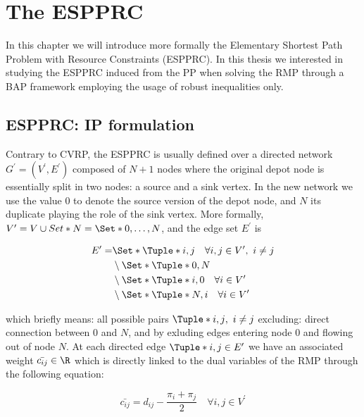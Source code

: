 \chapter{The ESPPRC}
In this chapter we will introduce more formally the Elementary Shortest Path Problem with Resource Constraints (ESPPRC).
In this thesis we interested in studying the ESPPRC induced from the PP when solving the RMP through a BAP framework employing the usage of robust inequalities only.


\section{ESPPRC: IP formulation}
Contrary to CVRP, the ESPPRC is usually defined over a directed network $G^\prime = (V^\prime, E^\prime)$ composed
of $N + 1$ nodes where the original depot node is essentially split in two nodes: a source and a sink vertex.
In the new network we use the value $0$ to denote the source version of the depot node, and $N$ its duplicate
playing the role of the sink vertex.
More formally, $V^\prime = V \cup Set*{N} = \Set*{ 0,\dots, N }$, and the edge set $E^\prime$ is

\begin{equation}
	\begin{aligned}
		E^\prime = & \Set*{\Tuple*{i, j} \quad \forall i, j \in V^\prime,\ i \ne j } \\
		           & \setminus \Set*{ \Tuple*{0, N} }                                \\
		           & \setminus \Set*{ \Tuple*{i, 0} \quad \forall i \in V^\prime }   \\
		           & \setminus \Set*{ \Tuple*{N, i} \quad \forall i \in V^\prime }   \\
	\end{aligned}
\end{equation}

which briefly means: all possible pairs $\Tuple*{i, j},\ i \ne j$ excluding: direct connection between $0$ and $N$, and by exluding edges entering node $0$ and flowing out of node $N$.
At each directed edge $\Tuple*{i, j} \in E^\prime$ we have an associated weight $\bar{c_{ij}} \in \R$ which is directly linked to the dual variables of the RMP through the following equation:

\begin{equation}
	\bar{c_{ij}} = d_{ij} - \frac{\pi_i + \pi_j}{2} \quad \forall i, j \in V^\prime
\end{equation}

